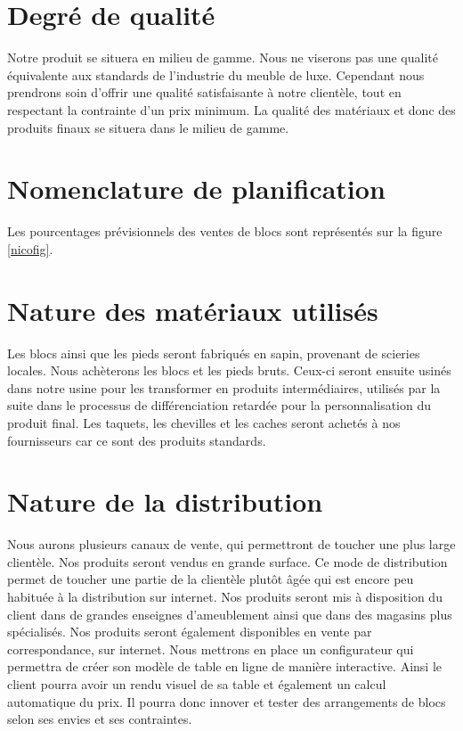 \section{Degré de qualité}
Notre produit se situera en milieu de gamme. Nous ne viserons pas une qualité équivalente aux standards de l'industrie du meuble de luxe. Cependant nous prendrons soin d'offrir une qualité satisfaisante à notre clientèle, tout en respectant la contrainte d'un prix minimum. La qualité des matériaux et donc des produits finaux se situera dans le milieu de gamme.

\section{Nomenclature de planification}
Les pourcentages prévisionnels des ventes de blocs sont représentés sur la figure \ref{nicofig}. 

\section{Nature des matériaux utilisés}
Les blocs ainsi que les pieds seront fabriqués en sapin, provenant de scieries locales. Nous achèterons les blocs et les pieds bruts. Ceux-ci seront ensuite usinés dans notre usine pour les transformer en produits intermédiaires, utilisés par la suite dans le processus de différenciation retardée pour la personnalisation du produit final. 
Les taquets, les chevilles et les caches seront achetés à nos fournisseurs car ce sont des produits standards. 

\section{Nature de la distribution}
Nous aurons plusieurs canaux de vente, qui permettront de toucher une plus large clientèle.
Nos produits seront vendus en grande surface. Ce mode de distribution permet de toucher une partie de la clientèle plutôt âgée qui est encore peu habituée à la distribution sur internet. Nos produits seront mis à disposition du client dans de grandes enseignes d'ameublement ainsi que dans des magasins plus spécialisés. 
Nos produits seront également disponibles en vente par correspondance, sur internet. Nous mettrons en place un configurateur qui permettra de créer son modèle de table en ligne de manière interactive. Ainsi le client pourra avoir un rendu visuel de sa table et également un calcul automatique du prix. Il pourra donc innover et tester des arrangements de blocs selon ses envies et ses contraintes. 

